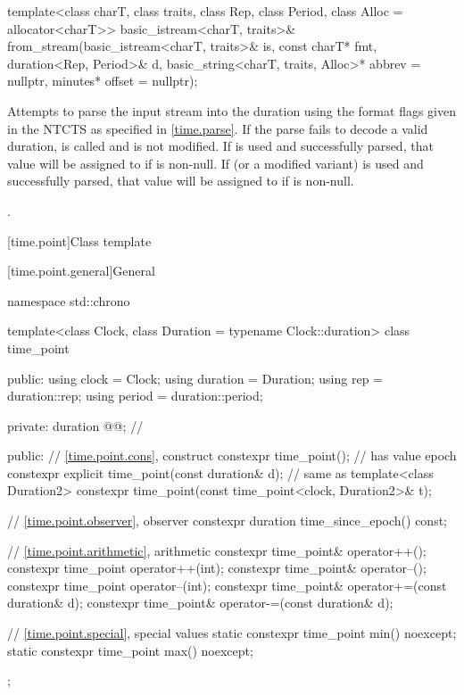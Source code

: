 %
\begin{itemdecl}
template<class charT, class traits, class Rep, class Period, class Alloc = allocator<charT>>
  basic_istream<charT, traits>&
    from_stream(basic_istream<charT, traits>& is, const charT* fmt,
                duration<Rep, Period>& d,
                basic_string<charT, traits, Alloc>* abbrev = nullptr,
                minutes* offset = nullptr);
\end{itemdecl}

\begin{itemdescr}
\pnum
\effects
Attempts to parse the input stream 
into the duration 
using the format flags given in the NTCTS 
as specified in \ref{time.parse}.
If the parse fails to decode a valid duration,
 is called and  is not modified.
If  is used and successfully parsed,
that value will be assigned to  if  is non-null.
If  (or a modified variant) is used and successfully parsed,
that value will be assigned to  if  is non-null.

\pnum
\returns
{}.
\end{itemdescr}

[time.point]{Class template }

[time.point.general]{General}

%
\begin{codeblock}
namespace std::chrono {
  template<class Clock, class Duration = typename Clock::duration>
  class time_point {
  public:
    using clock    = Clock;
    using duration = Duration;
    using rep      = duration::rep;
    using period   = duration::period;

  private:
    duration @@;                                                // \expos

  public:
    // \ref{time.point.cons}, construct
    constexpr time_point();                                     // has value epoch
    constexpr explicit time_point(const duration& d);           // same as 
    template<class Duration2>
      constexpr time_point(const time_point<clock, Duration2>& t);

    // \ref{time.point.observer}, observer
    constexpr duration time_since_epoch() const;

    // \ref{time.point.arithmetic}, arithmetic
    constexpr time_point& operator++();
    constexpr time_point operator++(int);
    constexpr time_point& operator--();
    constexpr time_point operator--(int);
    constexpr time_point& operator+=(const duration& d);
    constexpr time_point& operator-=(const duration& d);

    // \ref{time.point.special}, special values
    static constexpr time_point min() noexcept;
    static constexpr time_point max() noexcept;
  };
}
\end{codeblock}

